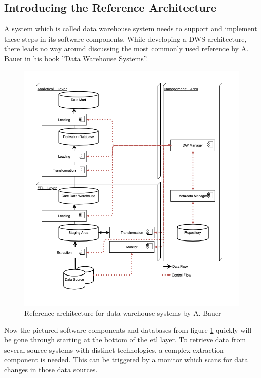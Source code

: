 \subsection{Introducing the Reference Architecture}
A system which is called data warehouse system needs to support and implement these steps in its software components. While developing a DWS architecture, there leads no way around discussing the most commonly used reference by A. Bauer in his book ''Data Warehouse Systems''. \cite{dwsRefArchitecture}\newline
\\
\begin{figure}[htb]
    \centering
    \includegraphics[scale=0.53]{pictures/InmonHubSpoke.png}
    \caption{Reference architecture for data warehouse systems by A. Bauer \cite[p.~42]{dwsRefArchitecture}}
    \label{fig:referenceArchitecture}
\end{figure}Now the pictured software components and databases from figure \ref{fig:referenceArchitecture} quickly  will be gone through starting at the bottom of the \acrfull{etl} layer. To retrieve data from several source systems with distinct technologies, a complex extraction component is needed. This can be triggered by a monitor which scans for data changes in those data sources.\newline
